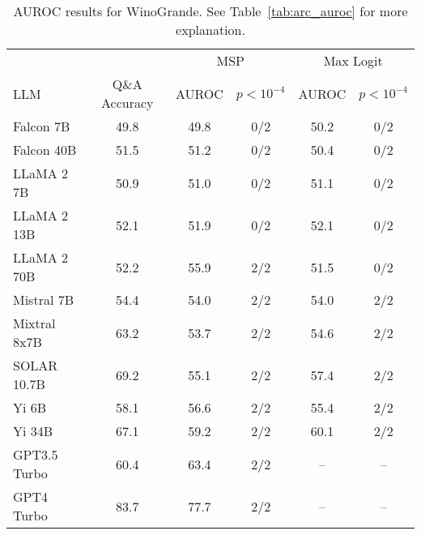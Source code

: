 \begin{table*}
\centering
\caption{AUROC results for WinoGrande. See Table~\ref{tab:arc_auroc} for more explanation.}
\label{tab:winogrande_auroc}
\begin{tabular}{lccccc}
\toprule
& & \multicolumn{2}{c}{MSP} & \multicolumn{2}{c}{Max Logit} \\ 
LLM & Q\&A Accuracy & AUROC & $p < 10^{-4}$ & AUROC & $p < 10^{-4}$\\ 
\cmidrule(lr){1-1} \cmidrule(lr){2-2} \cmidrule(lr){3-4} \cmidrule(lr){5-6}
Falcon 7B & 49.8 & 49.8 & 0/2 & 50.2 & 0/2 \\
Falcon 40B & 51.5 & 51.2 & 0/2 & 50.4 & 0/2 \\
LLaMA 2 7B & 50.9 & 51.0 & 0/2 & 51.1 & 0/2 \\
LLaMA 2 13B & 52.1 & 51.9 & 0/2 & 52.1 & 0/2 \\
LLaMA 2 70B & 52.2 & 55.9 & 2/2 & 51.5 & 0/2 \\
Mistral 7B & 54.4 & 54.0 & 2/2 & 54.0 & 2/2 \\
Mixtral 8x7B & 63.2 & 53.7 & 2/2 & 54.6 & 2/2 \\
SOLAR 10.7B & 69.2 & 55.1 & 2/2 & 57.4 & 2/2 \\
Yi 6B & 58.1 & 56.6 & 2/2 & 55.4 & 2/2 \\
Yi 34B & 67.1 & 59.2 & 2/2 & 60.1 & 2/2 \\
GPT3.5 Turbo & 60.4 & 63.4 & 2/2 & -- & -- \\
GPT4 Turbo & 83.7 & 77.7 & 2/2 & -- & -- \\
\bottomrule
\end{tabular}
\end{table*}
